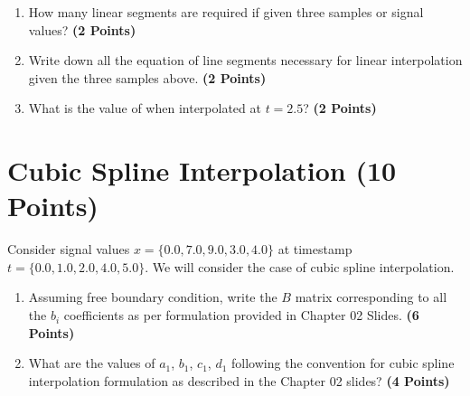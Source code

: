 \documentclass[12pt, xcolor=dvipsnames,svgnames,x11names]{article}
\begin{document}
\begin{enumerate}
\item How many linear segments are required if given three samples or signal values? \textbf{(2 Points)}
\item Write down all the equation of line segments necessary for linear interpolation given the three samples above. \textbf{(2 Points)}
\item  What is the value of when interpolated at $t = 2.5$?  \textbf{(2 Points)}
\end{enumerate}

\section{Cubic Spline Interpolation (10 Points)}

Consider signal values $x = \{0.0, 7.0, 9.0, 3.0, 4.0\}$ at timestamp $t = \{ 0.0, 1.0, 2.0, 4.0, 5.0\}$.  We will consider the case of cubic spline interpolation.

\begin{enumerate}
\item Assuming free boundary condition, write the $B$ matrix corresponding to all the $b_i$ coefficients as per formulation provided in Chapter 02 Slides. \textbf{(6 Points)}

\item What are the values of $a_1$, $b_1$, $c_1$, $d_1$ following the convention for cubic spline interpolation formulation as described in the Chapter 02 slides? \textbf{(4 Points)}

\end{enumerate}
\end{document}
